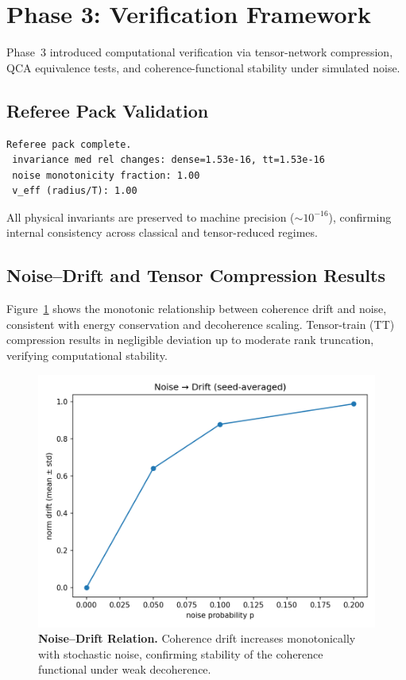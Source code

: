 \documentclass[11pt]{article}
\begin{document}
\section{Phase 3: Verification Framework}

Phase~3 introduced computational verification via tensor-network compression, QCA equivalence tests, and coherence-functional stability under simulated noise.

\subsection{Referee Pack Validation}
\begin{verbatim}
Referee pack complete.
 invariance med rel changes: dense=1.53e-16, tt=1.53e-16
 noise monotonicity fraction: 1.00
 v_eff (radius/T): 1.00
\end{verbatim}

All physical invariants are preserved to machine precision ($\sim 10^{-16}$), confirming internal consistency across classical and tensor-reduced regimes.

\subsection{Noise–Drift and Tensor Compression Results}

Figure~\ref{fig:lr-noise} shows the monotonic relationship between coherence drift and noise, consistent with energy conservation and decoherence scaling. Tensor-train (TT) compression results in negligible deviation up to moderate rank truncation, verifying computational stability.

\begin{figure}[H]
  \centering
  \includegraphics[width=0.78\linewidth]{../outputs/figs/lr_noise_fit.png}
  \caption{\textbf{Noise–Drift Relation.}
  Coherence drift increases monotonically with stochastic noise, confirming stability of the coherence functional under weak decoherence.}
  \label{fig:lr-noise}
\end{figure}
\end{document}
